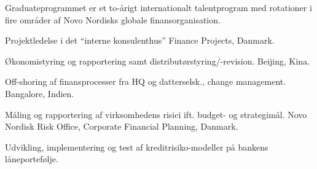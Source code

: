\documentclass[a4paper]{janus-resume}
\begin{document}
\begin{minipage}[t]{0.49\textwidth}
\sectionspace %



\begin{tightitemize}
\item Graduateprogrammet er et to-årigt internationalt talentprogram med rotationer i fire områder af Novo Nordisks globale finansorganisation.
\item Projektledelse i det ``interne konsulenthus'' Finance Projects, Danmark.
\item Økonomistyring og rapportering samt distributørstyring/-revision. Beijing, Kina.
\item Off-shoring af finansprocesser fra HQ og datterselsk., change management. Bangalore, Indien.
\item Måling og rapportering af virksomhedens risici ift. budget- og strategimål. Novo Nordisk Risk Office, Corporate Financial Planning, Danmark.
\end{tightitemize}

\sectionspace %


\begin{tightitemize}
\item Udvikling, implementering og test af kreditrisiko-modeller på bankens låneportefølje. 
\end{tightitemize}

\sectionspace %


\sectionspace %




\end{minipage} %
\end{document}
